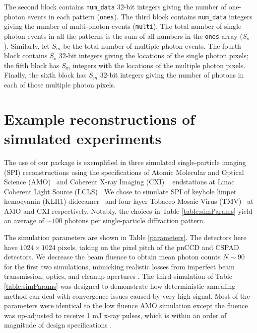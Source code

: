 \documentclass[]{iucr}              %
\begin{document}
The second block contains \texttt{num\_data} 32-bit integers giving the number of one-photon events in each pattern (\texttt{ones}). The third block contains \texttt{num\_data} integers giving the number of multi-photon events (\texttt{multi}). The total number of single photon events in all the patterns is the sum of all numbers in the \texttt{ones} array ($S_o$). Similarly, let $S_m$ be the total number of multiple photon events. The fourth block contains $S_o$ 32-bit integers giving the locations of the single photon pixels; the fifth block has $S_m$ integers with the locations of the multiple photon pixels. Finally, the sixth block has $S_m$ 32-bit integers giving the number of photons in each of those multiple photon pixels. 


     
\section{Example reconstructions of simulated experiments}\label{sec:simulations}

The use of our package is exemplified in three simulated single-particle imaging (SPI) reconstructions using the specifications of Atomic Molecular and Optical Science (AMO)~\cite{ferguson2015} and Coherent X-ray Imaging (CXI) ~\cite{liang2015} endstations at Linac Coherent Light Source (LCLS) \cite{Emma2010}. We chose to simulate SPI of keyhole limpet hemocyanin (KLH1) didecamer~\cite{gatsogiannis2009} and four-layer Tobacco Mosaic Virus (TMV)~\cite{bhyravbhatla1998} at AMO and CXI respectively. Notably, the choices in Table \ref{table:simParams} yield an average of $\sim 100$ photons per single-particle diffraction pattern.



The simulation parameters are shown in Table \ref{parameters}. The detectors here have $1024\times1024$ pixels, taking on the pixel pitch of the pnCCD\cite{Struder2010} and CSPAD\cite{hart2012} detectors. We decrease the beam fluence to obtain mean photon counts $N\sim 90$ for the first two simulations, mimicking realistic losses from imperfect beam transmission, optics, and cleanup apertures \cite{Loh2013}. The third simulation of Table \ref{table:simParams} was designed to demonstrate how deterministic annealing method can deal with convergence issues caused by very high signal. Most of the parameters were identical to the low fluence AMO simulation except the fluence was up-adjusted to receive 1 mJ x-ray pulses, which is within an order of magnitude of design specifications \cite{Emma2010}.
\end{document}
